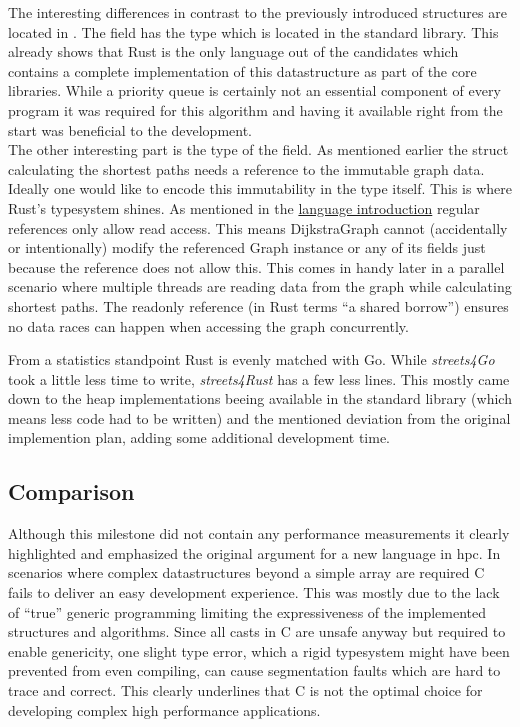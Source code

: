 The interesting differences in contrast to the previously introduced structures are located in . The  field has the type  which is located in the standard library. This already shows that Rust is the only language out of the candidates which contains a complete implementation of this datastructure as part of the core libraries. While a priority queue is certainly not an essential component of every program it was required for this algorithm and having it available right from the start was beneficial to the development.
\\


The other interesting part is the type of the  field. As mentioned earlier the struct calculating the shortest paths needs a reference to the immutable graph data. Ideally one would like to encode this immutability in the type itself. This is where Rust's typesystem shines. As mentioned in the \hyperref[subsec:State_of_the_art::Candidates::Rust]{language introduction} regular references only allow read access. This means DijkstraGraph cannot (accidentally or intentionally) modify the referenced Graph instance or any of its fields just because the reference does not allow this. This comes in handy later in a parallel scenario where multiple threads are reading data from the graph while calculating shortest paths. The readonly reference (in Rust terms ``a shared borrow'') ensures no data races can happen when accessing the graph concurrently.

From a statistics standpoint Rust is evenly matched with Go. While \textit{streets4Go} took a little less time to write, \textit{streets4Rust} has a few less lines. This mostly came down to the heap implementations beeing available in the standard library (which means less code had to be written) and the mentioned deviation from the original implemention plan, adding some additional development time.

\subsection{Comparison}
\label{subsec:Implementation::Graph_Representation::Comparison}

Although this milestone did not contain any performance measurements it clearly highlighted and emphasized the original argument for a new language in \acrlong{hpc}. In scenarios where complex datastructures beyond a simple array are required C fails to deliver an easy development experience. This was mostly due to the lack of ``true'' generic programming limiting the expressiveness of the implemented structures and algorithms. Since all casts in C are unsafe anyway but required to enable genericity, one slight type error, which a rigid typesystem might have been prevented from even compiling, can cause segmentation faults which are hard to trace and correct. This clearly underlines that C is not the optimal choice for developing complex high performance applications.

